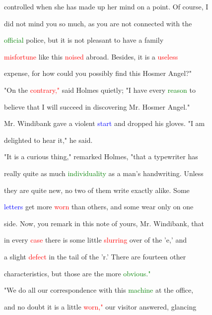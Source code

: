  controlled when she has made up her mind on a point. Of course, I

 did not mind you so much, as you are not connected with the

 \textcolor{green}{official} \textcolor{BurntOrange}{police,} but it is not \textcolor{BurntOrange}{pleasant} to have a family

 \textcolor{red}{misfortune} like this \textcolor{red}{noised} abroad. Besides, it is a \textcolor{red}{useless}

 expense, for how could you possibly find this Hosmer \textcolor{BurntOrange}{Angel?"}



 "On the \textcolor{red}{contrary,"} said Holmes quietly; "I have every \textcolor{green}{reason} to

 believe that I will \textcolor{BurntOrange}{succeed} in discovering Mr. Hosmer \textcolor{BurntOrange}{Angel."}



 Mr. Windibank gave a \textcolor{BurntOrange}{violent} \textcolor{blue}{start} and dropped his gloves. "I am

 \textcolor{BurntOrange}{delighted} to hear it," he said.



 "It is a curious thing," remarked Holmes, "that a typewriter has

 really quite as much \textcolor{green}{individuality} as a man's handwriting. Unless

 they are quite new, no two of them write exactly alike. Some

 \textcolor{blue}{letters} get more \textcolor{red}{worn} than others, and some \textcolor{BurntOrange}{wear} only on one

 side. Now, you remark in this note of yours, Mr. Windibank, that

 in every \textcolor{red}{case} there is some little \textcolor{red}{slurring} over of the 'e,' and

 a slight \textcolor{red}{defect} in the tail of the 'r.' There are fourteen other

 characteristics, but those are the more \textcolor{green}{obvious."}



 "We do all our \textcolor{BurntOrange}{correspondence} with this \textcolor{green}{machine} at the office,

 and no \textcolor{BurntOrange}{doubt} it is a little \textcolor{red}{worn,"} our \textcolor{BurntOrange}{visitor} answered, glancing

